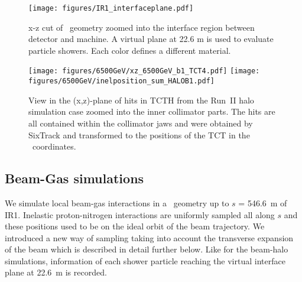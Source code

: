 

\begin{figure}%
\begin{center}
\texttt{[image: figures/IR1\_interfaceplane.pdf]}
\end{center}
\vspace{-0.6cm}
 \caption{x-z cut of \fluka~geometry zoomed into the interface region between detector and machine. A virtual plane at 22.6 m is used to evaluate particle showers. Each color defines a different material.
  \label{flukaGeo_nominal}}
\end{figure}


\begin{figure}%
\begin{center}
  \texttt{[image: figures/6500GeV/xz\_6500GeV\_b1\_TCT4.pdf]}
  \texttt{[image: figures/6500GeV/inelposition\_sum\_HALOB1.pdf]}
\end{center}
\vspace{-0.6cm}
 \caption{View in the (x,z)-plane of hits in TCTH from the Run~II halo simulation case zoomed into the inner collimator parts. The hits are all contained within the collimator jaws and were obtained by SixTrack and transformed to the positions of the TCT in the \fluka~coordinates.
  \label{tctHits}}
\end{figure}


\subsection{Beam-Gas simulations \label{BGdescript}}

We simulate local beam-gas interactions in a \fluka~geometry up to $s$ = 546.6~m of IR1. Inelastic proton-nitrogen interactions are uniformly sampled all along $s$ and these positions used to be on the ideal orbit of the beam trajectory. We introduced a new way of sampling taking into account the transverse expansion of the beam which is described in detail further below.
Like for the beam-halo simulations, information of each shower particle reaching the virtual interface plane at 22.6~m is recorded.

